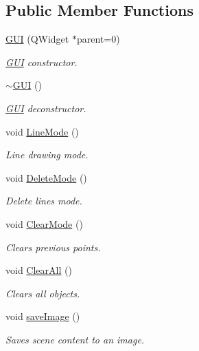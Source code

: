 \subsection*{Public Member Functions}
\begin{DoxyCompactItemize}
\item 
\mbox{\hyperlink{classGUI_acb0ba8c6fc121d814d30560e2c29f2fe}{G\+UI}} (Q\+Widget $\ast$parent=0)
\begin{DoxyCompactList}\small\item\em \mbox{\hyperlink{classGUI}{G\+UI}} constructor. \end{DoxyCompactList}\item 
\mbox{\hyperlink{classGUI_ac9cae2328dcb5d83bdfaeca49a2eb695}{$\sim$\+G\+UI}} ()
\begin{DoxyCompactList}\small\item\em \mbox{\hyperlink{classGUI}{G\+UI}} deconstructor. \end{DoxyCompactList}\item 
void \mbox{\hyperlink{classGUI_a91fab5d31617ad5631d17dfceb5a0fad}{Line\+Mode}} ()
\begin{DoxyCompactList}\small\item\em Line drawing mode. \end{DoxyCompactList}\item 
void \mbox{\hyperlink{classGUI_aac66154aaa763aac4d20e55cbd1bdc0d}{Delete\+Mode}} ()
\begin{DoxyCompactList}\small\item\em Delete lines mode. \end{DoxyCompactList}\item 
void \mbox{\hyperlink{classGUI_afb6e169c9372800e69c70a3889420325}{Clear\+Mode}} ()
\begin{DoxyCompactList}\small\item\em Clears previous points. \end{DoxyCompactList}\item 
void \mbox{\hyperlink{classGUI_a19c82a62a2b41460c81317fa967e3a1e}{Clear\+All}} ()
\begin{DoxyCompactList}\small\item\em Clears all objects. \end{DoxyCompactList}\item 
void \mbox{\hyperlink{classGUI_a44684af7706c021022520e2c4829c3ee}{save\+Image}} ()
\begin{DoxyCompactList}\small\item\em Saves scene content to an image. \end{DoxyCompactList}\item 

\end{DoxyCompactItemize}
